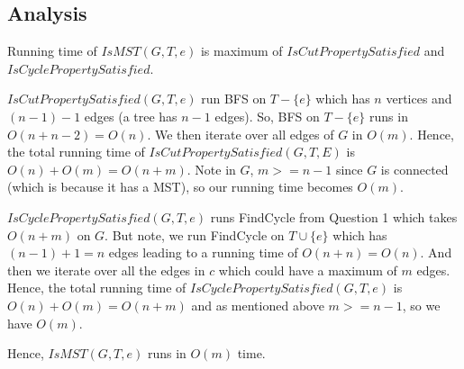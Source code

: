 \documentclass{article}
\begin{document}
    \subsection*{Analysis}
    Running time of $IsMST(G, T, e)$ is maximum of $IsCutPropertySatisfied$ and $IsCyclePropertySatisfied$.

    $IsCutPropertySatisfied(G, T, e)$ run BFS on $T-\{e\}$ which has $n$ vertices and $(n-1)-1$ edges (a tree has $n-1$ edges). So, BFS on $T-\{e\}$ runs in $O(n+n-2) = O(n)$. We then iterate over all edges of $G$ in $O(m)$. Hence, the total running time of $IsCutPropertySatisfied(G, T, E)$ is $O(n) + O(m) = O(n+m)$. Note in $G$, $m >= n-1$ since $G$ is connected (which is because it has a MST), so our running time becomes $O(m)$.

    $IsCyclePropertySatisfied(G, T, e)$ runs FindCycle from Question 1 which takes $O(n+m)$ on $G$. But note, we run FindCycle on $T \cup \{e\}$ which has $(n-1)+1 = n$ edges leading to a running time of $O(n+n) = O(n)$. And then we iterate over all the edges in $c$ which could have a maximum of $m$ edges. Hence, the total running time of $IsCyclePropertySatisfied(G, T, e)$ is $O(n) + O(m) = O(n+m)$ and as mentioned above $m >= n-1$, so we have $O(m)$.

    Hence, $IsMST(G, T, e)$ runs in $O(m)$ time.
\end{document}
